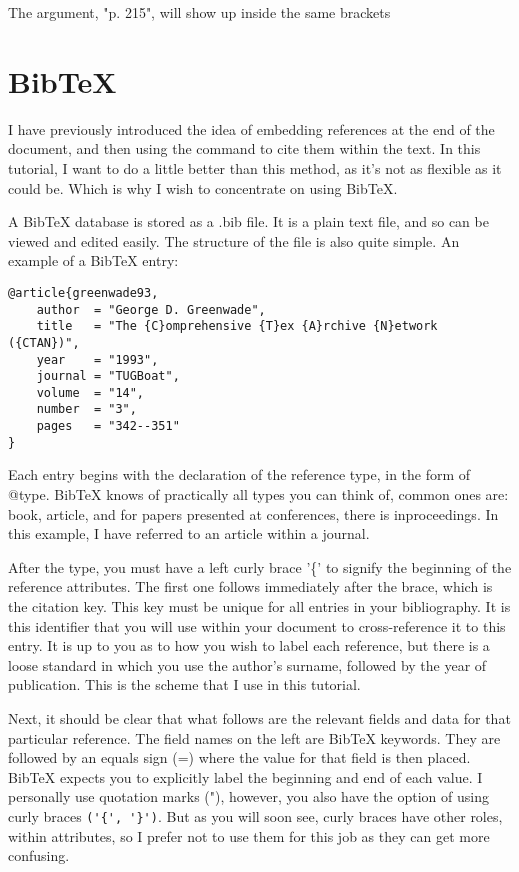 \begin{refsection}
The argument, "p. 215", will show up inside the same brackets

\section{BibTeX}

I have previously introduced the idea of embedding references at the end of the document, and then using the  command to cite them within the text. In this tutorial, I want to do a little better than this method, as it's not as flexible as it could be. Which is why I wish to concentrate on using BibTeX.

A BibTeX database is stored as a .bib file. It is a plain text file, and so can be viewed and edited easily. The structure of the file is also quite simple. An example of a BibTeX entry:

\begin{verbatim}
@article{greenwade93,
    author  = "George D. Greenwade",
    title   = "The {C}omprehensive {T}ex {A}rchive {N}etwork ({CTAN})",
    year    = "1993",
    journal = "TUGBoat",
    volume  = "14",
    number  = "3",
    pages   = "342--351"
}
\end{verbatim}

Each entry begins with the declaration of the reference type, in the form of @type. BibTeX knows of practically all types you can think of, common ones are: book, article, and for papers presented at conferences, there is inproceedings. In this example, I have referred to an article within a journal.

After the type, you must have a left curly brace '\{' to signify the beginning of the reference attributes. The first one follows immediately after the brace, which is the citation key. This key must be unique for all entries in your bibliography. It is this identifier that you will use within your document to cross-reference it to this entry. It is up to you as to how you wish to label each reference, but there is a loose standard in which you use the author's surname, followed by the year of publication. This is the scheme that I use in this tutorial.

Next, it should be clear that what follows are the relevant fields and data for that particular reference. The field names on the left are BibTeX keywords. They are followed by an equals sign (=) where the value for that field is then placed. BibTeX expects you to explicitly label the beginning and end of each value. I personally use quotation marks ("), however, you also have the option of using curly braces \verb+('{', '}')+. But as you will soon see, curly braces have other roles, within attributes, so I prefer not to use them for this job as they can get more confusing. 


\end{refsection}
